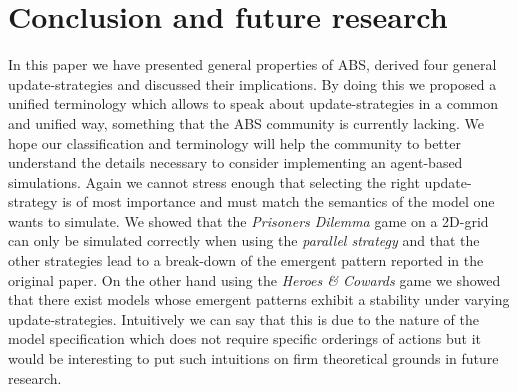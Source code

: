 \section{Conclusion and future research}
In this paper we have presented general properties of ABS, derived four general update-strategies and discussed their implications. By doing this we proposed a unified terminology which allows to speak about update-strategies in a common and unified way, something that the ABS community is currently lacking. We hope our classification and terminology will help the community to better understand the details necessary to consider implementing an agent-based simulations. Again we cannot stress enough that selecting the right update-strategy is of most importance and must match the semantics of the model one wants to simulate.
We showed that the \textit{Prisoners Dilemma} game on a 2D-grid can only be simulated correctly when using the \textit{parallel strategy} and that the other strategies lead to a break-down of the emergent pattern reported in the original paper. On the other hand using the \textit{Heroes \& Cowards} game we showed that there exist models whose emergent patterns exhibit a stability under varying update-strategies. Intuitively we can say that this is due to the nature of the model specification which does not require specific orderings of actions but it would be interesting to put such intuitions on firm theoretical grounds in future research.